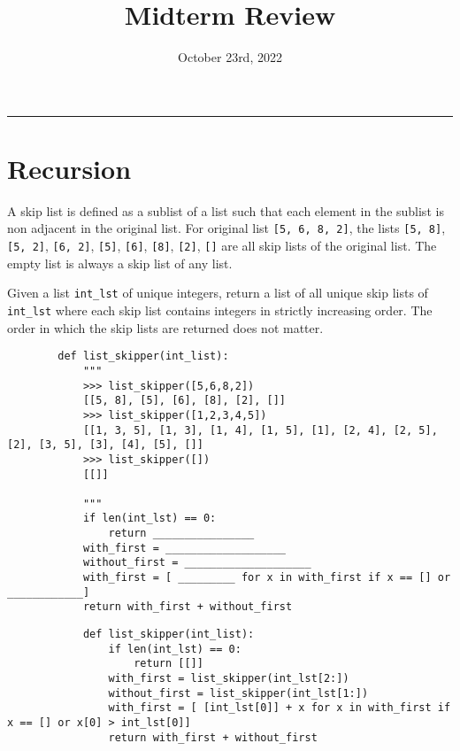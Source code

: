 \documentclass{exam}
\title{Midterm Review}
\date{October 23rd, 2022}
\begin{document}
\maketitle
\rule{\textwidth}{0.15em}
\fontsize{12}{15}\selectfont


\section{Recursion}
    \begin{blocksection}
        A skip list is defined as a sublist of a list such that each element in the sublist is non adjacent in the
        original list. For original list \lstinline{[5, 6, 8, 2]}, the lists \lstinline{[5, 8]}, \lstinline{[5, 2]}, \lstinline{[6, 2]}, \lstinline{[5]}, \lstinline{[6]}, \lstinline{[8]}, \lstinline{[2]}, \lstinline{[]} are
        all skip lists of the original list. The empty list is always a skip list of any list.

        Given a list \lstinline{int_lst} of unique integers, return a list of all unique skip lists of \lstinline{int_lst} where each skip
        list contains integers in strictly increasing order. The order in which the skip lists are returned does not matter.
        
        \begin{lstlisting}
        def list_skipper(int_list):
            """
            >>> list_skipper([5,6,8,2])
            [[5, 8], [5], [6], [8], [2], []]
            >>> list_skipper([1,2,3,4,5])
            [[1, 3, 5], [1, 3], [1, 4], [1, 5], [1], [2, 4], [2, 5], [2], [3, 5], [3], [4], [5], []]
            >>> list_skipper([])
            [[]]

            """
            if len(int_lst) == 0:
                return ________________
            with_first = ___________________
            without_first = ____________________
            with_first = [ _________ for x in with_first if x == [] or ____________]
            return with_first + without_first
        \end{lstlisting}
    \end{blocksection}
    \begin{solution}
        \begin{lstlisting}
            def list_skipper(int_list):
                if len(int_lst) == 0:
                    return [[]]
                with_first = list_skipper(int_lst[2:])
                without_first = list_skipper(int_lst[1:])
                with_first = [ [int_lst[0]] + x for x in with_first if x == [] or x[0] > int_lst[0]]
                return with_first + without_first
        \end{lstlisting}
    \end{solution}
\end{document}
